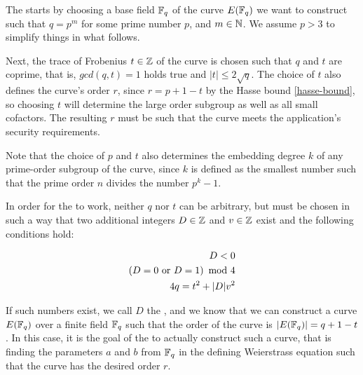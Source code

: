 
The  starts by choosing a base field $\mathbb{F}_{q}$ of the curve $E(\mathbb{F}_q)$ we want to construct such that $q = p^m$ for some prime number $p$, and  $m\in \mathbb{N}$. We assume $p>3$ to simplify things in what follows. 

Next, the trace of Frobenius $t\in \mathbb{Z}$ of the curve is chosen such that $q$ and $t$ are coprime, that is, $gcd(q,t)=1$ holds true and $|t|\leq 2\sqrt{q}$. The choice of $t$ also defines the curve's order $r$, since $r=p+1-t$ by the Hasse bound \eqref{hasse-bound}, so choosing $t$ will determine the large order subgroup as well as all small cofactors. The resulting $r$ must be such that the curve meets the application's security requirements. 

Note that the choice of $p$ and $t$ also determines the embedding degree $k$ of any prime-order subgroup of the curve, since $k$ is defined as the smallest number such that the prime order $n$ divides the number $p^k-1$.

In order for the  to work, neither $q$ nor $t$ can be arbitrary, but must be chosen in such a way that two additional integers $D\in \mathbb{Z}$ and $v\in \mathbb{Z}$ exist and the following conditions hold:

\begin{equation}\label{eq:D-criteria}
\begin{split}
D<0\\
\left( D =0  \text{ or } D=1\right) \text{ mod } 4\\
4q  = t^2 + |D|v^2 
\end{split}
\end{equation}

If such numbers exist, we call $D$ the , and we know that we can construct a curve $E(\mathbb{F}_q)$ over a finite field $\mathbb{F}_q$ such that the order of the curve is $|E(\mathbb{F}_q)|= q+1-t$. In this case, it is the goal of the  to actually construct such a curve, that is finding the parameters $a$ and $b$ from $\mathbb{F}_q$ in the defining Weierstrass equation such that the curve has the desired order $r$. 


